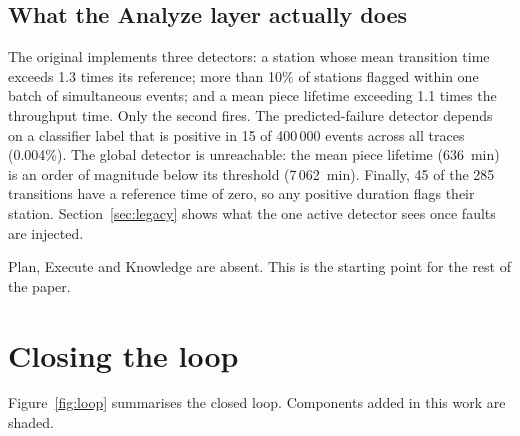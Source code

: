 \documentclass[preprint,11pt]{elsarticle}
\begin{document}
\subsection{What the Analyze layer actually does}
The original implements three detectors: a station whose mean transition time exceeds 1.3 times its reference; more than 10\% of stations flagged within one batch of simultaneous events; and a mean piece lifetime exceeding 1.1 times the throughput time. Only the second fires. The predicted-failure detector depends on a classifier label that is positive in 15 of 400\,000 events across all traces (0.004\%). The global detector is unreachable: the mean piece lifetime (636~min) is an order of magnitude below its threshold (7\,062~min). Finally, 45 of the 285 transitions have a reference time of zero, so any positive duration flags their station. Section~\ref{sec:legacy} shows what the one active detector sees once faults are injected.

Plan, Execute and Knowledge are absent. This is the starting point for the rest of the paper.

\section{Closing the loop}
\label{sec:loop}

Figure~\ref{fig:loop} summarises the closed loop. Components added in this work are shaded.
\end{document}

